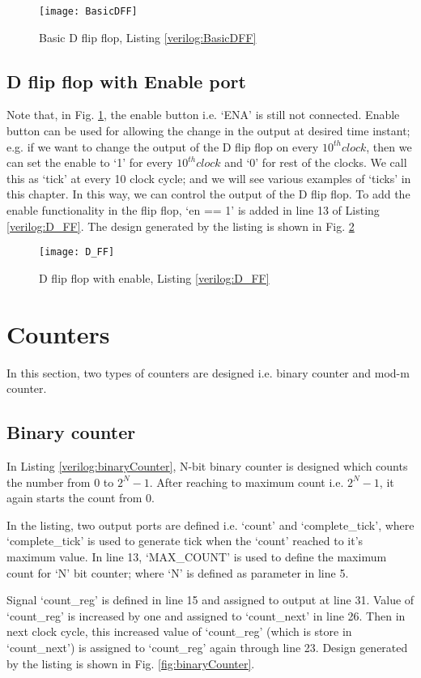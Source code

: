 \begin{figure}[!h]
	\centering
	\texttt{[image: BasicDFF]}
	\caption{Basic D flip flop, Listing \ref{verilog:BasicDFF}}
	\label{fig:BasicDFF}
\end{figure}

\subsection{D flip flop with Enable port}
Note that, in Fig. \ref{fig:BasicDFF}, the enable button i.e. `ENA' is still not connected. Enable button can be used for allowing the change in the output at desired time instant; e.g. if we want to change the output of the D flip flop on every $10^{th} clock$, then we can set the enable to `1' for every $10^{th} clock$ and `0' for rest of the clocks. We call this as `tick' at every 10 clock cycle; and we will see various examples of `ticks' in this chapter. In this way, we can control the output of the D flip flop. To add the enable functionality in the flip flop, `en == 1' is added in line 13 of Listing \ref{verilog:D_FF}. The design generated by the listing is shown in Fig. \ref{fig:D_FF}



\begin{figure}[!h]
	\centering
	\texttt{[image: D\_FF]}
	\caption{D flip flop with enable, Listing \ref{verilog:D_FF}}
	\label{fig:D_FF}
\end{figure}


\section{Counters}
In this section, two types of counters are designed i.e. binary counter and mod-m counter. 
\subsection{Binary counter}
In Listing \ref{verilog:binaryCounter}, N-bit binary counter is designed which counts the number from 0 to $2^N-1$. After reaching to maximum count i.e. $2^N-1$, it again starts the count from 0.  

\begin{explanation}
	In the listing, two output ports are defined i.e. `count' and `complete\_tick', where `complete\_tick' is used to generate tick when the `count' reached to it's maximum value. In line 13, `MAX\_COUNT' is used to define the maximum count for `N' bit counter; where `N' is defined as parameter in line 5. 
	
	Signal `count\_reg' is defined in line 15 and assigned to output at line 31. Value of `count\_reg' is increased by one and assigned to `count\_next' in line 26. Then in next clock cycle, this increased value of `count\_reg' (which is store in `count\_next') is assigned to  `count\_reg' again through line 23. Design generated by the listing is shown in Fig. \ref{fig:binaryCounter}.	
\end{explanation}

